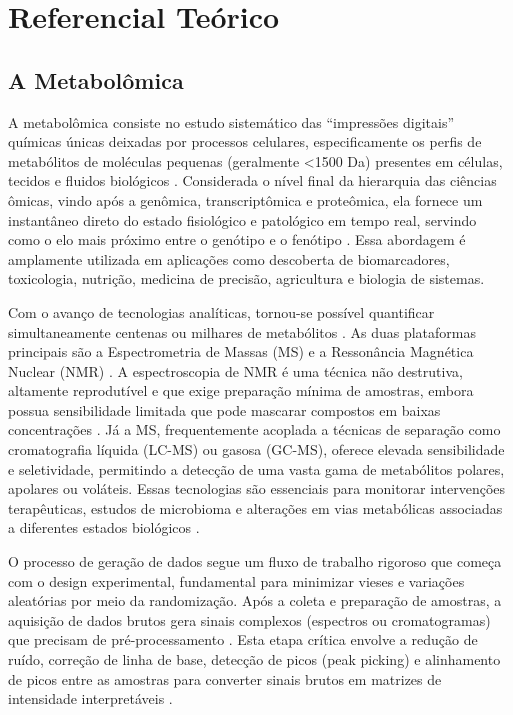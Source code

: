 % 


\chapter[Referencial Teórico]{Referencial Teórico}

{\section{\textbf{A Metabolômica}}}

A metabolômica consiste no estudo sistemático das ``impressões digitais'' químicas únicas deixadas por processos celulares, especificamente os perfis de metabólitos de moléculas pequenas (geralmente <1500 Da) presentes em células, tecidos e fluidos biológicos \cite{LILAND2011827,picone2026integrating}. Considerada o nível final da hierarquia das ciências ômicas, vindo após a genômica, transcriptômica e proteômica, ela fornece um instantâneo direto do estado fisiológico e patológico em tempo real, servindo como o elo mais próximo entre o genótipo e o fenótipo \cite{picone2026integrating,LILAND2011827,anwardeen2023statistical}. Essa abordagem é amplamente utilizada em aplicações como descoberta de biomarcadores, toxicologia, nutrição, medicina de precisão, agricultura e biologia de sistemas.

Com o avanço de tecnologias analíticas, tornou-se possível quantificar simultaneamente centenas ou milhares de metabólitos \cite{li2016performance}. As duas plataformas principais são a Espectrometria de Massas (MS) e a Ressonância Magnética Nuclear (NMR) \cite{anwardeen2023statistical}. A espectroscopia de NMR é uma técnica não destrutiva, altamente reprodutível e que exige preparação mínima de amostras, embora possua sensibilidade limitada que pode mascarar compostos em baixas concentrações \cite{mayonu2026evaluation}. Já a MS, frequentemente acoplada a técnicas de separação como cromatografia líquida (LC-MS) ou gasosa (GC-MS), oferece elevada sensibilidade e seletividade, permitindo a detecção de uma vasta gama de metabólitos polares, apolares ou voláteis. Essas tecnologias são essenciais para monitorar intervenções terapêuticas, estudos de microbioma e alterações em vias metabólicas associadas a diferentes estados biológicos \cite{pang2024metaboanalyst}.

O processo de geração de dados segue um fluxo de trabalho rigoroso que começa com o design experimental, fundamental para minimizar vieses e variações aleatórias por meio da randomização. Após a coleta e preparação de amostras, a aquisição de dados brutos gera sinais complexos (espectros ou cromatogramas) que precisam de pré-processamento \cite{LILAND2011827,anwardeen2023statistical}. Esta etapa crítica envolve a redução de ruído, correção de linha de base, detecção de picos (peak picking) e alinhamento de picos entre as amostras para converter sinais brutos em matrizes de intensidade interpretáveis \cite{sun2024pretreating}.

